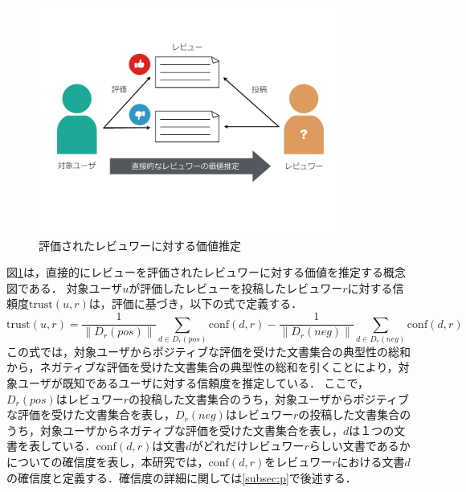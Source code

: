 \documentclass[a4paper,11pt,oneside,openany]{jsbook}
\begin{document}
\begin{figure}[tb]
	\begin{center} %
		\includegraphics[width = 100mm]{figures/trust1.pdf} %
	\end{center}
	\caption{評価されたレビュワーに対する価値推定} %
	\label{fig:trust1} %
\end{figure}
図\ref{fig:trust1}は，直接的にレビューを評価されたレビュワーに対する価値を推定する概念図である．
対象ユーザ$u$が評価したレビューを投稿したレビュワー$r$に対する信頼度$\mathrm{trust}(u, r)$は，評価に基づき，以下の式で定義する．
\begin{equation}
\mathrm{trust}(u ,r)=\frac{1}{\|D_r(pos)\|}\sum_{d\in{D_r(pos)}} \mathrm{conf}(d, r) - \frac{1}{\|D_r(neg)\|}\sum_{d\in{D_r(neg)}} \mathrm{conf}(d, r)
\end{equation}
この式では，対象ユーザからポジティブな評価を受けた文書集合の典型性の総和から，ネガティブな評価を受けた文書集合の典型性の総和を引くことにより，対象ユーザが既知であるユーザに対する信頼度を推定している．
ここで，$D_r(pos)$はレビュワー$r$の投稿した文書集合のうち，対象ユーザからポジティブな評価を受けた文書集合を表し，$D_r(neg)$はレビュワー$r$の投稿した文書集合のうち，対象ユーザからネガティブな評価を受けた文書集合を表し，$d$は１つの文書を表している．$\mathrm{conf}(d, r)$は文書$d$がどれだけレビュワー$r$らしい文書であるかについての確信度を表し，本研究では，$\mathrm{conf}(d, r)$をレビュワー$r$における文書$d$の確信度と定義する．確信度の詳細に関しては\ref{subsec:p}で後述する．
\end{document}
